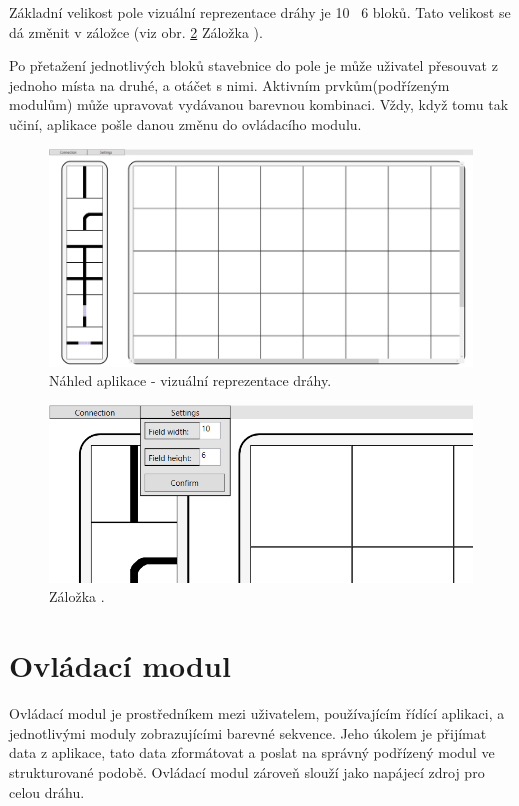             Základní velikost pole vizuální reprezentace dráhy je 10 \texttimes~6 bloků. Tato velikost se dá změnit v záložce (viz obr. \ref{fig:settings} Záložka ).

            Po přetažení jednotlivých bloků stavebnice do pole je může uživatel přesouvat z jednoho místa na druhé, a otáčet s nimi. Aktivním prvkům(podřízeným modulům) může upravovat vydávanou barevnou kombinaci. Vždy, když tomu tak učiní, aplikace pošle danou změnu do ovládacího modulu.
            \begin{figure}[h!]
            \begin{center}
          \includegraphics[scale = 0.35]{images/application.png}
          \caption{Náhled aplikace - vizuální reprezentace dráhy.}
          \label{fig:application}
          \end{center}
        \end{figure}
        \begin{figure}[h!]
        \begin{center}
          \includegraphics[scale = 0.8]{images/settings.png}
          \caption{Záložka .}
          \label{fig:settings}
          \end{center}
        \end{figure}
\newpage
    \section{Ovládací modul}
        Ovládací modul je prostředníkem mezi uživatelem, používajícím řídící aplikaci, a jednotlivými moduly zobrazujícími barevné sekvence. Jeho úkolem je přijímat data z aplikace, tato data zformátovat a poslat na správný podřízený modul ve strukturované podobě. Ovládací modul zároveň slouží jako napájecí zdroj pro celou dráhu.
